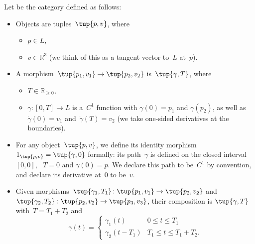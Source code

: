 \begin{definition}
Let \Berg be the category defined as follows:
\begin{itemize}
\item Objects are tuples~$\tup{p,v}$, where
\begin{itemize}
\item $p \in L$,
\item $v \in \mathbb{R}^3$ (we think of this as a tangent vector to~$L$ at~$p$).
\end{itemize}

\item A morphism~$\tup{p_1, v_1} \rightarrow \tup{p_2, v_2}$ is~$\tup{\gamma, T}$,
where
\begin{itemize}
\item $T \in \mathbb{R}_{\geq 0}$,
\item $\gamma \colon [0, T] \to L$ is a~$C^1$ function with $\gamma(0)=p_1$ and $\gamma(p_2)$, as well as ~$\dot \gamma(0) = v_1$ and~$\dot \gamma(T) = v_2$  (we take one-sided derivatives at the boundaries).
\end{itemize}

\item For any object~$\tup{p, v}$, we define its identity morphism~$1_{\tup{p,v}} = \tup{\gamma, 0}$ formally: its path~$\gamma$ is defined on the closed interval~$[0,0]$, ~$T= 0$ and $\gamma(0) = p$. We declare this path to be~$C^1$ by convention, and declare its derivative at~$0$ to be~$v$.

\item Given morphisms~$\tup{\gamma_1, T_1}\colon \tup{p_1, v_1} \to \tup{p_2, v_2}$ and~$\tup{\gamma_2, T_2}: \tup{p_2, v_2} \to \tup{p_3, v_3}$, their composition is $\tup{\gamma, T}$ with~$T = T_1 + T_2$ and
\begin{equation}
 \gamma(t) = \begin{cases}
 \gamma_1(t) &0 \leq t \leq T_1 \\
\gamma_2(t - T_1) & T_1 \leq t \leq T_1 + T_2.
 \end{cases}
\end{equation}
\end{itemize}
\end{definition}



